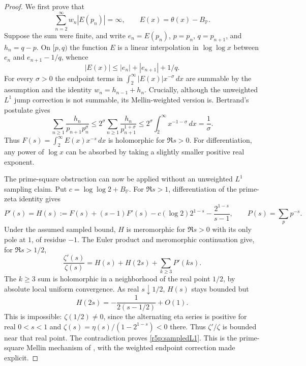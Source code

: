 \documentclass[11pt,a4paper]{article}
\theoremstyle{definition}\newtheorem{definition}[theorem]{Definition}
\theoremstyle{remark}\newtheorem{remark}[theorem]{Remark}
\numberwithin{equation}{section}
\begin{document}
\begin{proof}
We first prove that
\begin{equation}\label{r5p:sampledL1}
 \sum_{n=2}^{\infty}w_n|E(p_n)|=\infty,
 \qquad E(x)=\theta(x)-B_{\mathbb P}.
\end{equation}
Suppose the sum were finite, and write $e_n=E(p_n)$,
$p=p_n$, $q=p_{n+1}$, and $h_n=q-p$.
On $[p,q)$ the function $E$ is a linear interpolation in
$\log\log x$ between $e_n$ and $e_{n+1}-1/q$, whence
\[
 |E(x)|\leq|e_n|+|e_{n+1}|+1/q.
\]
For every $\sigma>0$ the endpoint terms in
$\int_2^\infty|E(x)|x^{-\sigma}\,dx$ are summable by the
assumption and the identity $w_n=h_{n-1}+h_n$.
Crucially, although the unweighted $L^1$ jump correction is not
summable, its Mellin-weighted version is.  Bertrand's postulate gives
\begin{equation}\label{r5p:weightedcorrection}
 \sum_{n\geq1}\frac{h_n}{p_{n+1}p_n^\sigma}
 \leq2^\sigma\sum_{n\geq1}\frac{h_n}{p_{n+1}^{1+\sigma}}
 \leq2^\sigma\int_2^\infty x^{-1-\sigma}\,dx
 =\frac1\sigma.
\end{equation}
Thus $F(s)=\int_2^\infty E(x)x^{-s}\,dx$ is holomorphic for
$\Re s>0$.  For differentiation, any power of $\log x$ can be
absorbed by taking a slightly smaller positive real exponent.

The prime-square obstruction can now be applied without an
unweighted $L^1$ sampling claim.  Put $c=\log\log2+B_{\mathbb P}$.
For $\Re s>1$, differentiation of the prime-zeta identity gives
\[
 P'(s)=H(s):=F(s)+(s-1)F'(s)
           -c(\log2)2^{1-s}-\frac{2^{1-s}}{s-1},
 \qquad P(s)=\sum_p p^{-s}.
\]
Under the assumed sampled bound, $H$ is meromorphic for
$\Re s>0$ with its only pole at $1$, of residue $-1$.
The Euler product and meromorphic continuation give, for
$\Re s>1/2$,
\begin{equation}\label{r5p:squareobstruction}
 \frac{\zeta'(s)}{\zeta(s)}
       =H(s)+H(2s)+\sum_{k\geq3}P'(ks).
\end{equation}
The $k\geq3$ sum is holomorphic in a neighborhood of the real
point $1/2$, by absolute local uniform convergence.
As real $s\downarrow1/2$, $H(s)$ stays bounded but
\[
 H(2s)=-\frac1{2(s-1/2)}+O(1).
\]
This is impossible: $\zeta(1/2)\ne0$, since the alternating eta
series is positive for real $0<s<1$ and
$\zeta(s)=\eta(s)/(1-2^{1-s})<0$ there.
Thus $\zeta'/\zeta$ is bounded near that real point.
The contradiction proves \eqref{r5p:sampledL1}.
This is the prime-square Mellin mechanism of \cite{PrimeCircles},
with the weighted endpoint correction made explicit.


\end{proof}
\end{document}
